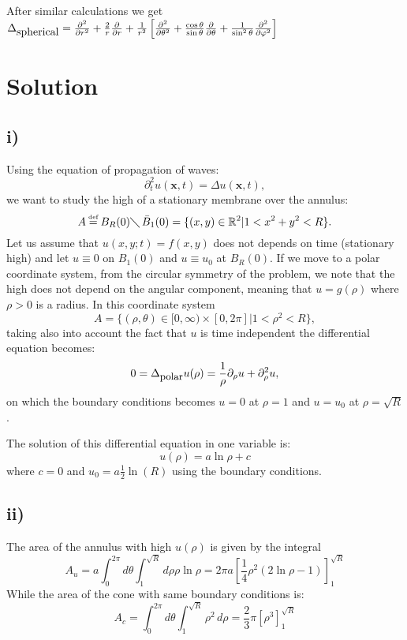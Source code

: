 \documentclass{article}[a4paper]
\newcommand*{\eqdef}{\ensuremath{\overset{\mathclap{\text{\tiny def}}}{=}}}
\begin{document}
After similar calculations we get $\Delta_{\mbox{spherical}} = \frac{\partial^2}{\partial r^2} + \frac{2}{r} \pdv{}{r} + \frac{1}{r^2}\left[ \frac{\partial^2}{\partial \theta^2} + \frac{\cos{\theta}}{\sin{\theta}}\pdv{}{\theta} + \frac{1}{\sin^2{\theta}}\frac{\partial^2}{\partial \varphi^2} \right]$
\section{Solution} %
\subsection*{i)}
Using the equation of propagation of waves:
\[
    \partial_t^2 u(\mathbf{x}, t) = \Delta u(\mathbf{x}, t),
\]
we want to study the high of a stationary membrane over the annulus:
\[
    A \eqdef B_R(0) \diagdown\, \bar{B}_1(0) = \{ (x, y) \in \mathbb{R}^2 | 1<x^2+y^2 < R\}.
\]
Let us assume that $u(x,y;t) = f(x, y)$ does not depends on time (stationary high) and let $u \equiv 0$ on $B_1(0)$ and $u \equiv u_0$ at $B_R(0)$.
If we move to a polar coordinate system, from the circular symmetry of the problem, we note that the high does not depend on the angular component, meaning that $u = g(\rho)$ where $\rho >0$ is a radius. In this coordinate system
\[
    A = \{ (\rho, \theta) \in [0, \infty) \times [0, 2\pi]| 1<\rho^2 < R\},
\]
taking also into account the fact that $u$ is time independent the differential equation becomes:
\[
     0 = \Delta_{\mbox{\small polar}} u(\rho) = \frac{1}{\rho} \partial_\rho u + \partial_\rho^2 u,
\]
on which the boundary conditions becomes $u = 0$ at $\rho = 1$ and $u = u_0$ at $\rho = \sqrt{R}$.

The solution of this differential equation in one variable is:
\[
    u(\rho) = a\ln{\rho} + c
\]
where $c=0$ and $u_0 = a \frac{1}{2} \ln(R)$ using the boundary conditions.
\subsection*{ii)}
The area of the annulus with high $u(\rho)$ is given by the integral
\[
    A_u = a \int_{0}^{2\pi} d \theta \int^{\sqrt{R}}_{1} d\rho \rho \ln{\rho} = 2\pi a\left[ \frac{1}{4} \rho^2 (2\ln{\rho} - 1) \right]^{\sqrt{R}}_1
\]
While the area of the cone with same boundary conditions is:
\[
    A_c = \int_{0}^{2\pi} d \theta \int^{\sqrt{R}}_{1} \rho^2 \, d\rho = \frac{2}{3}\pi \left[ \rho^3 \right]^{\sqrt{R}}_1
\]
\end{document}

